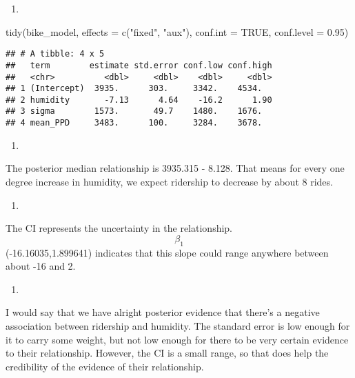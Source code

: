 \documentclass[
]{article}
\newenvironment{Shaded}{\begin{snugshade}}{\end{snugshade}}
\newcommand{\AttributeTok}[1]{\textcolor[rgb]{0.77,0.63,0.00}{#1}}
\newcommand{\ConstantTok}[1]{\textcolor[rgb]{0.00,0.00,0.00}{#1}}
\newcommand{\FloatTok}[1]{\textcolor[rgb]{0.00,0.00,0.81}{#1}}
\newcommand{\FunctionTok}[1]{\textcolor[rgb]{0.00,0.00,0.00}{#1}}
\newcommand{\NormalTok}[1]{#1}
\newcommand{\StringTok}[1]{\textcolor[rgb]{0.31,0.60,0.02}{#1}}
\providecommand{\tightlist}{%
  \setlength{\itemsep}{0pt}\setlength{\parskip}{0pt}}
\begin{document}
\begin{enumerate}
\def\labelenumi{\alph{enumi}.}
\tightlist
\item
\end{enumerate}

\begin{Shaded}
\begin{Highlighting}[]
\FunctionTok{tidy}\NormalTok{(bike\_model, }\AttributeTok{effects =} \FunctionTok{c}\NormalTok{(}\StringTok{"fixed"}\NormalTok{, }\StringTok{"aux"}\NormalTok{),}
     \AttributeTok{conf.int =} \ConstantTok{TRUE}\NormalTok{, }\AttributeTok{conf.level =} \FloatTok{0.95}\NormalTok{)}
\end{Highlighting}
\end{Shaded}

\begin{verbatim}
## # A tibble: 4 x 5
##   term        estimate std.error conf.low conf.high
##   <chr>          <dbl>     <dbl>    <dbl>     <dbl>
## 1 (Intercept)  3935.      303.     3342.    4534.  
## 2 humidity       -7.13      4.64    -16.2      1.90
## 3 sigma        1573.       49.7    1480.    1676.  
## 4 mean_PPD     3483.      100.     3284.    3678.
\end{verbatim}

\begin{enumerate}
\def\labelenumi{\alph{enumi}.}
\setcounter{enumi}{1}
\tightlist
\item
\end{enumerate}

The posterior median relationship is 3935.315 - 8.128. That means for
every one degree increase in humidity, we expect ridership to decrease
by about 8 rides.

\begin{enumerate}
\def\labelenumi{\alph{enumi}.}
\setcounter{enumi}{2}
\tightlist
\item
\end{enumerate}

The CI represents the uncertainty in the relationship. \[\beta_1\]
(-16.16035,1.899641) indicates that this slope could range anywhere
between about -16 and 2.

\begin{enumerate}
\def\labelenumi{\alph{enumi}.}
\setcounter{enumi}{3}
\tightlist
\item
\end{enumerate}

I would say that we have alright posterior evidence that there's a
negative association between ridership and humidity. The standard error
is low enough for it to carry some weight, but not low enough for there
to be very certain evidence to their relationship. However, the CI is a
small range, so that does help the credibility of the evidence of their
relationship.
\end{document}
